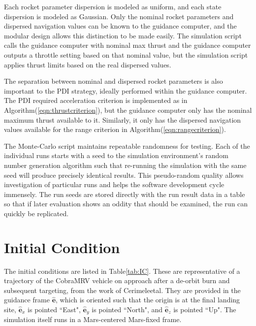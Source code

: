 Each rocket parameter dispersion is modeled as uniform, and each state dispersion is modeled as Gaussian. Only the nominal rocket parameters and dispersed navigation values can be known to the guidance computer, and the modular design allows this distinction to be made easily. The simulation script calls the guidance computer with nominal max thrust and the guidance computer outputs a throttle setting based on that nominal value, but the simulation script applies thrust limits based on the real dispersed values. 

The separation between nominal and dispersed rocket parameters is also important to the PDI strategy, ideally performed within the guidance computer. The PDI required acceleration criterion is implemented as in Algorithm\:(\ref{eqn:thrustcriterion}), but the guidance computer only has the nominal maximum thrust available to it. Similarly, it only has the dispersed navigation values available for the range criterion in Algorithm\:(\ref{eqn:rangecriterion}).

The Monte-Carlo script maintains repeatable randomness for testing. Each of the individual runs starts with a seed to the simulation environment's random number generation algorithm such that re-running the simulation with the same seed will produce precisely identical results. This pseudo-random quality allows investigation of particular runs and helps the software development cycle immensely. The run seeds are stored directly with the run result data in a table so that if later evaluation shows an oddity that should be examined, the run can quickly be replicated.


\section{Initial Condition} \label{sec:IC}
The initial conditions are listed in Table\:\ref{tab:IC}. These are representative of a trajectory of the CobraMRV vehicle on approach after a de-orbit burn and subsequent targeting, from the work of Cerimele\:et\:al\:\cite{CERIMELE}. They are provided in the guidance frame $\hat{\bm{e}}$, which is oriented such that the origin is at the final landing site, $\hat{\bm{e}}_x$ is pointed ``East", $\hat{\bm{e}}_y$ is pointed ``North", and $\hat{\bm{e}}_z$ is pointed ``Up". The simulation itself runs in a Mars-centered Mars-fixed frame. 

